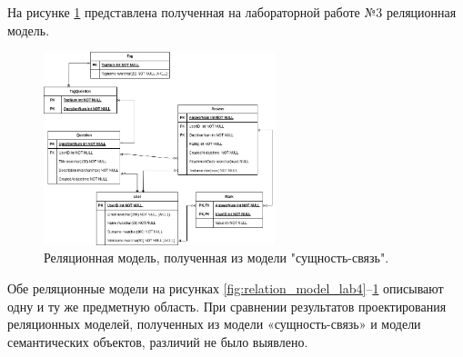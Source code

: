 \documentclass[a4paper, 14pt]{extarticle}
\begin{document}
На рисунке \ref{fig:relation_model_lab3} представлена полученная на лабораторной работе №3 реляционная модель.

\begin{figure}[ht]
\centering
\includegraphics[width=0.6\textwidth]{Diagram2}
\caption{Реляционная модель, полученная из модели "сущность-связь".} 
\label{fig:relation_model_lab3}
\end{figure}


Обе реляционные модели на рисунках \ref{fig:relation_model_lab4}–\ref{fig:relation_model_lab3} описывают одну и ту же предметную область. При сравнении результатов проектирования реляционных моделей, полученных из модели «сущность-связь» и модели семантических объектов, различий не было выявлено.
\end{document}
